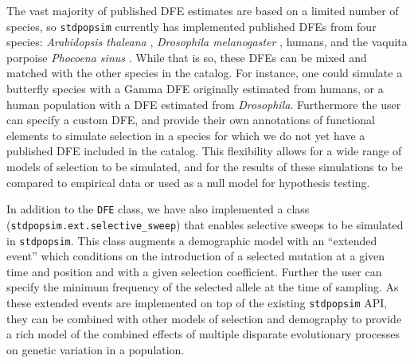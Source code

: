 \documentclass[hidelinks]{article}
\newcommand{\stdpopsim}{\texttt{stdpopsim}\xspace}
\begin{document}
    The vast majority of published DFE estimates are based on a limited number of species,
    so \stdpopsim currently has implemented published DFEs from
    four species: \textit{Arabidopsis thaleana} \citep{huber2018gene}, \textit{Drosophila melanogaster} \citep{ragsdale2016triallelic,huber2017determining},
    humans, and the vaquita porpoise \textit{Phocoena sinus} \citep{robinson2022critically}.
    While that is so, these DFEs can be mixed and matched with the other species
    in the catalog. For instance, one could simulate a butterfly species with a Gamma DFE originally
    estimated from humans, or a human population with a DFE estimated from \textit{Drosophila}.
    Furthermore the user can specify a custom DFE, and provide their own annotations
    of functional elements to simulate selection in a species for which we do not yet have 
    a published DFE included in the catalog. This flexibility allows for a wide range of
    models of selection to be simulated, and for the results of these simulations to be
    compared to empirical data or used as a null model for hypothesis testing.

    In addition to the \texttt{DFE} class, we have also implemented a class (\texttt{stdpopsim.ext.selective\_sweep})
    that enables selective sweeps to be simulated in \stdpopsim.
    This class augments a demographic model with an ``extended event''
    which conditions on the introduction of a selected mutation at a given time and position
    and with a given selection coefficient. Further the user can specify the minimum frequency
    of the selected allele at the time of sampling. As these extended events are implemented
    on top of the existing \stdpopsim API, they can be combined with other models of selection
    and demography to provide a rich model of the combined effects of multiple disparate evolutionary processes
    on genetic variation in a population.
    
\end{document}
